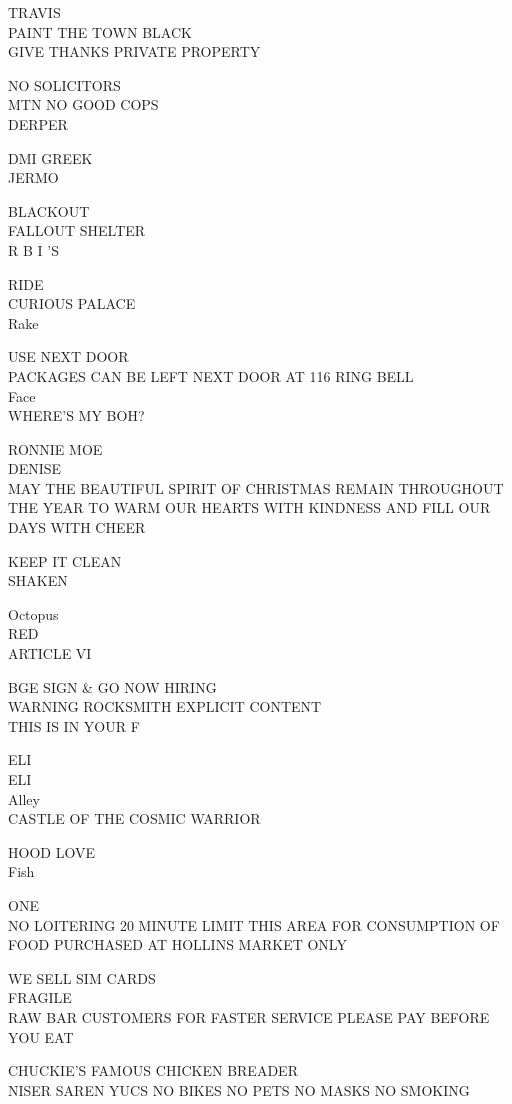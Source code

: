 \documentclass[10pt,letterpaper]{article}
\begin{document}
TRAVIS\\
PAINT THE TOWN BLACK\\
GIVE THANKS PRIVATE PROPERTY

NO SOLICITORS\\
MTN NO GOOD COPS\\
DERPER

DMI GREEK\\
JERMO

BLACKOUT\\
FALLOUT SHELTER\\
R B I 'S

RIDE\\
CURIOUS PALACE\\
Rake

USE NEXT DOOR\\
PACKAGES CAN BE LEFT NEXT DOOR AT 116 RING BELL\\
Face\\
WHERE'S MY BOH?

RONNIE MOE\\
DENISE\\
MAY THE BEAUTIFUL SPIRIT OF CHRISTMAS REMAIN THROUGHOUT THE YEAR TO WARM OUR HEARTS WITH KINDNESS AND FILL OUR DAYS WITH CHEER

KEEP IT CLEAN\\
SHAKEN

Octopus\\
RED\\
ARTICLE VI

BGE SIGN \& GO NOW HIRING\\
WARNING ROCKSMITH EXPLICIT CONTENT\\
THIS IS IN YOUR F

ELI\\
ELI\\
Alley\\
CASTLE OF THE COSMIC WARRIOR

HOOD LOVE\\
Fish

ONE\\
NO LOITERING 20 MINUTE LIMIT THIS AREA FOR CONSUMPTION OF FOOD PURCHASED AT HOLLINS MARKET ONLY

WE SELL SIM CARDS\\
FRAGILE\\
RAW BAR CUSTOMERS FOR FASTER SERVICE PLEASE PAY BEFORE YOU EAT

CHUCKIE'S FAMOUS CHICKEN BREADER\\
NISER SAREN YUCS NO BIKES NO PETS NO MASKS NO SMOKING
\end{document}
